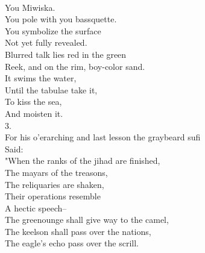 \documentclass[smalldemyvopaper,11pt,twoside,onecolumn,openright,extrafontsizes]{memoir}
\begin{document}
\\You Miwiska.
\\You pole with you bassquette.
\\You symbolize the surface
\\Not yet fully revealed.
\\Blurred talk lies red in the green
\\Reek, and on the rim, boy-color sand.
\\It swims the water,
\\Until the tabulae take it,
\\To kiss the sea,
\\And moisten it.
\\3.
\\For his o'erarching and last lesson the graybeard sufi
\\Said:
\\"When the ranks of the jihad are finished,
\\The mayars of the treasons,
\\The reliquaries are shaken,
\\Their operations resemble
\\A hectic speech--
\\The greenounge shall give way to the camel,
\\The keelson shall pass over the nations,
\\The eagle's echo pass over the scrill.
\end{document}
